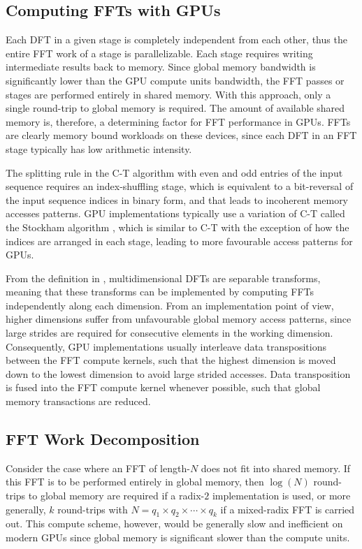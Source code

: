 \documentclass[11pt, onecolumn, journal,compsoc]{IEEEtran}
\theoremstyle{problemstyle}
\begin{document}
\subsection{Computing FFTs with GPUs}

Each DFT in a given stage is completely independent from each other, thus the entire FFT work of a stage is parallelizable. Each stage requires writing intermediate results back to memory. Since global memory bandwidth is significantly lower than the GPU compute units bandwidth, the FFT passes or stages are performed entirely in shared memory. With this approach, only a single round-trip to global memory is required. The amount of available shared memory is, therefore, a determining factor for FFT performance in GPUs. FFTs are clearly memory bound workloads on these devices, since each DFT in an FFT stage typically has low arithmetic intensity.

The splitting rule in the C-T algorithm with even and odd entries of the input sequence requires an index-shuffling stage, which is equivalent to a bit-reversal of the input sequence indices in binary form, and that leads to incoherent memory accesses patterns. GPU implementations typically use a variation of C-T called the Stockham algorithm \cite{gonabrdoyusmma08}, which is similar to C-T with the exception of how the indices are arranged in each stage, leading to more favourable access patterns for GPUs.

From the definition in , multidimensional DFTs are separable transforms, meaning that these transforms can be implemented by computing FFTs independently along each dimension. From an implementation point of view, higher dimensions suffer from unfavourable global memory access patterns, since large strides are required for consecutive elements in the working dimension. Consequently, GPU implementations usually interleave data transpositions between the FFT compute kernels, such that the highest dimension is moved down to the lowest dimension to avoid large strided accesses. Data transposition is fused into the FFT compute kernel whenever possible, such that global memory transactions are reduced.

\subsection{FFT Work Decomposition}

Consider the case where an FFT of length-$N$ does not fit into shared memory. If this FFT is to be performed entirely in global memory, then $\log(N)$ round-trips to global memory are required if a radix-$2$ implementation is used, or more generally, $k$ round-trips with $N=q_1 \times q_2 \times \cdots \times q_k$ if a mixed-radix FFT is carried out. This compute scheme, however, would be generally slow and inefficient on modern GPUs since global memory is significant slower than the compute units. 
\end{document}

